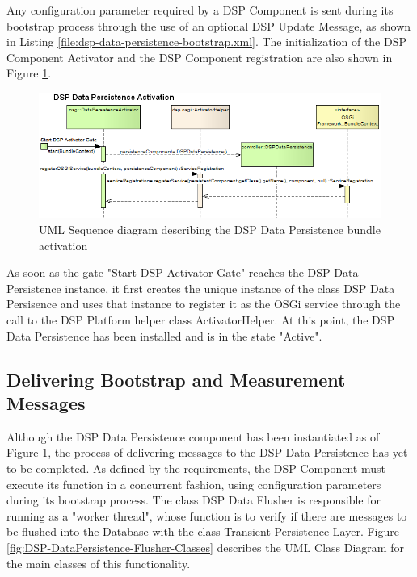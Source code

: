 Any configuration parameter required by a DSP Component is sent during its
bootstrap process through the use of an optional DSP Update Message, as shown
in Listing \ref{file:dsp-data-persistence-bootstrap.xml}. The initialization of
the DSP Component Activator and the DSP Component registration are also shown
in Figure \ref{fig:From-OSGi-Framework-to-DSP-Data-PersistenceActivator-Sequence-Diagram}.

\begin{figure}[!b]
  \centering
  \includegraphics[scale=0.5]{../diagrams/From-OSGi-Framework-to-DSP-Data-PersistenceActivator-Sequence-Diagram}
  \caption{UML Sequence diagram describing the DSP Data Persistence bundle activation}
  \label{fig:From-OSGi-Framework-to-DSP-Data-PersistenceActivator-Sequence-Diagram}
\end{figure}

As soon as the gate "Start DSP Activator Gate" reaches the DSP Data
Persistence instance, it first creates the unique instance of the class DSP
Data Persisence and uses that instance to register it as the OSGi service
through the call to the DSP Platform helper class ActivatorHelper. At this
point, the DSP Data Persistence has been installed and is in the state
"Active".

\subsection{Delivering Bootstrap and Measurement Messages}

Although the DSP Data Persistence component has been instantiated as of Figure
\ref{fig:From-OSGi-Framework-to-DSP-Data-PersistenceActivator-Sequence-Diagram}, the
process of delivering messages to the DSP Data Persistence has yet to be
completed. As defined by the requirements, the DSP Component must execute its
function in a concurrent fashion, using configuration parameters during its
bootstrap process. The class DSP Data Flusher is responsible for running as a
"worker thread", whose function is to verify if there are messages to be
flushed into the Database with the class Transient Persistence Layer. Figure
\ref{fig:DSP-DataPersistence-Flusher-Classes} describes the UML Class Diagram
for the main classes of this functionality.

